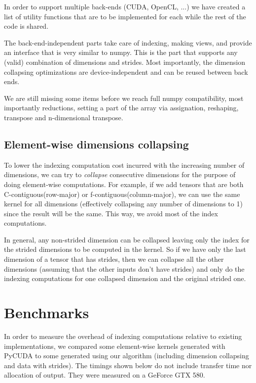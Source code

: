 \documentclass{article} %
\begin{document}
In order to support multiple back-ends (CUDA, OpenCL, ...) we have created a list of utility functions that are to be implemented for each 
while the rest of the code is shared.

The back-end-independent parts take care of indexing, making views, and provide an interface that is very similar to numpy.
This is the part that supports any (valid) combination of dimensions and strides.
Most importantly, the dimension collapsing optimizations are device-independent and can be reused between back ends.

We are still missing some items before we reach full numpy compatibility, most importantly reductions, setting a part of the array via assignation, reshaping, transpose and n-dimensional transpose.

\subsection{Element-wise dimensions collapsing}

To lower the indexing computation cost incurred with the increasing number of dimensions, we can try to \emph{collapse} consecutive dimensions for the purpose of doing element-wise computations.
For example, if we add tensors that are both C-contiguous(row-major) or f-contiguous(column-major), we can use the same kernel for all dimensions (effectively collapsing any number of dimensions to 1) since the result will be the same.
This way,  we avoid most of the index computations.

In general, any non-strided dimension can be collapsed leaving only the index for the strided dimensions to be computed in the kernel.
So if we have only the last dimension of a tensor that has strides, then we can collapse all the other dimensions (assuming that the other inputs don't have strides) and only do the indexing computations for one collapsed dimension and the original strided one.

\section{Benchmarks}

In order to measure the overhead of indexing computations relative to existing implementations, we compared some element-wise kernels generated with PyCUDA to some generated using our algorithm (including dimension collapsing and data with strides).
The timings shown below do not include transfer time nor allocation of output.
They were measured on a GeForce GTX 580.
\end{document}
